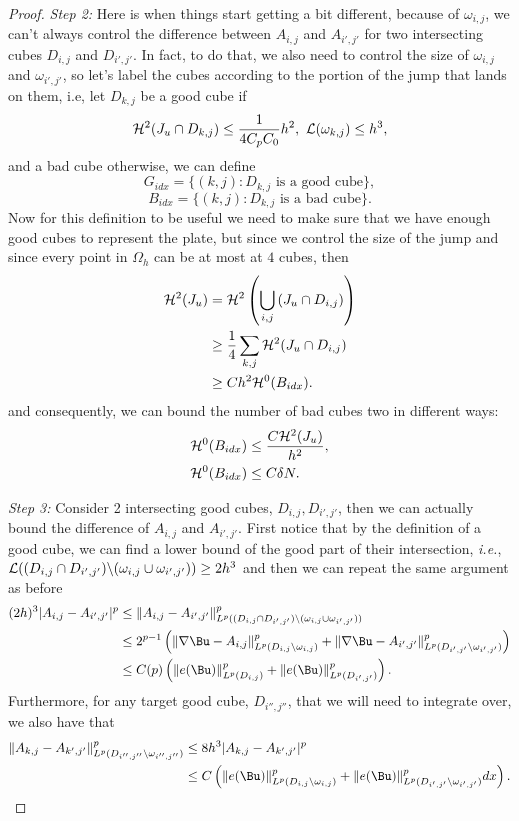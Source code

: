 \begin{proof}
    \textit{Step 2:}
    Here is when things start getting a bit different, because of $\omega_{i,j}$, we can't always control the difference between $A_{i,j}$ and $A_{i',j'}$ for two intersecting cubes $D_{i,j}$ and $D_{i',j'}$. In fact, to do that, we also need to control the size of $\omega_{i,j}$ and $\omega_{i',j'}$, so let's label  the cubes according to the portion of the jump that lands on them, i.e, let  $D_{k,j}$ be a good cube if 
    $${\mathcal H}^2(J_u\cap D_{k,j})\leq \frac{1}{4C_pC_0} h^2, \ {\mathcal L}(\omega_{k,j})\leq h^3,$$
    and a bad cube otherwise, we can define
    $$G_{idx}=\{(k,j): D_{k,j}\text{ is a good cube}\},$$ 
    $$B_{idx}=\{(k,j): D_{k,j}\text{ is a bad cube}\}.$$
    Now for this definition to be useful we need to make sure that we have enough good cubes to represent the plate, but since we control the size of  the jump and since every point in $\Omega_h$ can be at  most at $4$ cubes, then
    \begin{align*}
        {\mathcal H}^2(J_u)&= {\mathcal H}^2\left(\bigcup_{i,j}\left(J_u\cap D_{i,j}\right)\right)\\
        &\geq \frac{1}{4}\sum_{k,j}{\mathcal H}^2(J_u\cap D_{i,j})\\
        &\geq Ch^2{\mathcal H}^0(B_{idx}).
    \end{align*}
    and consequently, we  can bound the number of bad cubes two in different ways:
    \begin{align}\label{badCubeBound}
        {\mathcal H}^0(B_{idx})&\leq\frac{C{\mathcal H}^2(J_u)}{h^2},\\
        {\mathcal H}^0(B_{idx})&\leq C \delta N.
    \end{align}

    \textit{Step 3:} Consider 2 intersecting good cubes, $D_{i,j},D_{i',j'}$, then we can actually bound  the  difference of $A_{i,j}$ and $A_{i',j'}$. First notice that by the definition of a good cube, we can find a lower bound of the good part of their intersection, \textit{i.e.}, ${\mathcal L}((D_{i,j}\cap D_{i',j'})\backslash(\omega_{i,j}\cup\omega_{i',j'}))\geq 2h^3$ and  then we can repeat the same argument as before
    \begin{align*}
        (2h)^3|A_{i,j}-A_{i',j'}|^p &\leq\|A_{i,j}-A_{i',j'}\|^p_{L^p((D_{i,j}\cap D_{i',j'})\backslash(\omega_{i,j}\cup\omega_{i',j'}))}\\
        &\leq 2^{p-1}\left(\|\nabla \Bu-A_{i,j}\|^p_{L^p(D_{i,j}\backslash \omega_{i,j})}+\|\nabla \Bu-A_{i',j'}\|^p_{L^p(D_{i',j'}\backslash \omega_{i',j'})}\right)\\
        &\leq C(p)\left(\|e(\Bu)\|^p_{L^p(D_{i,j})}+\|e(\Bu)\|^p_{L^p(D_{i',j'})}\right).
    \end{align*}
    Furthermore, for any target good cube, $D_{i'',j''}$, that we will need to integrate over, we also have that
    \begin{align*}
    \|A_{k,j}-A_{k',j'}\|^p_{L^p(D_{i'',j''}\backslash \omega_{i'',j''})} & \leq 8h^3 |A_{k,j}-A_{k',j'}|^p\\
    &\leq C \left(\|e(\Bu)\|^p_{L^p(D_{i,j}\backslash \omega_{i,j})} +\|e(\Bu)\|^p_{L^p(D_{i',j'}\backslash \omega_{i',j'})} d x\right).
    \end{align*}
    

\end{proof}
